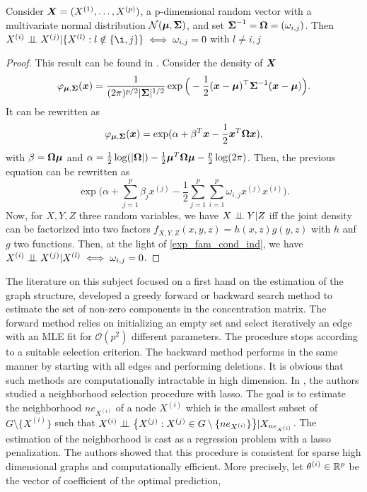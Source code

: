 \begin{lemma}
Consider $\boldsymbol X=(X^{(1)},\dots,X^{(p)})$, a p-dimensional random vector with a multivariate normal distribution $\mathcal N(\boldsymbol\mu, \boldsymbol\Sigma)$, and set $\boldsymbol\Sigma^{-1}=\boldsymbol\Omega=(\omega_{i,j})$. Then $X^{(i)} \ci X^{(j)}|\{X^{(l)}: l\notin\{\i,j\}\} \iff \omega_{i,j}=0$ with $l\neq i,j$ 
\end{lemma}
\begin{proof}
This result can be found in \citep{edwards2000introduction}. Consider the density of $\boldsymbol X$
\begin{equation}
  \varphi_{\boldsymbol\mu,\boldsymbol\Sigma}(\boldsymbol x)=\frac{1}{(2\pi)^{p/2}|\boldsymbol\Sigma|^{1/2}} \exp\Big(-\frac{1}{2}(\boldsymbol x-\boldsymbol\mu)^\top\boldsymbol\Sigma^{-1}(\boldsymbol x-\boldsymbol\mu)\Big).
\end{equation}
It can be rewritten as
\begin{equation}
  \varphi_{\boldsymbol\mu,\boldsymbol\Sigma}(\boldsymbol x) = \exp(\alpha + \beta^T\boldsymbol x-\frac{1}{2}\boldsymbol x^T\boldsymbol\Omega\boldsymbol x),
\end{equation}
with $\beta=\boldsymbol\Omega\boldsymbol\mu$ and $\alpha=\frac{1}{2}\log(|\boldsymbol\Omega|)-\frac{1}{2}\boldsymbol\mu^T\boldsymbol\Omega\boldsymbol\mu-\frac{p}{2}\log(2\pi)$. Then, the previous equation can be rewritten as 
\begin{equation}
\label{exp_fam_cond_ind}
  \exp\big(\alpha + \sum_{j=1}^p\beta_jx^{(j)}-\frac{1}{2}\sum_{j=1}^p\sum_{i=1}^p\omega_{i,j}x^{(j)}x^{(i)}\big).
\end{equation}
Now, for $X,Y,Z$ three random variables, we have $X \perp\!\!\!\perp Y|Z$ iff the joint density can be factorized into two factors $f_{X,Y,Z}(x,y,z)=h(x,z)g(y,z)$ with $h$ anf $g$ two functions. Then, at the light of  \cref{exp_fam_cond_ind}, we have $X^{(i)}\perp\!\!\!\perp X^{(j)}|X^{(l)} \iff \omega_{i,j}=0$.
\end{proof}
The literature on this subject focused on a first hand on the estimation of the graph structure, \citep{dempster1972cov_select} developed a greedy forward or backward search method to estimate the set of non-zero components in the concentration matrix. The forward method relies on initializing an empty set and select iteratively an edge with an MLE fit for $\mathcal{O}(p^2)$ different parameters. The procedure stops according to a suitable selection criterion. The backward method performs in the same manner by starting with all edges and performing deletions. It is obvious that such methods are computationally intractable in high dimension. In \citep{meinshausen2006}, the authors studied a neighborhood selection procedure with lasso. The goal is to estimate the neighborhood $ne_{X^{(i)}}$ of a node $X^{(i)}$ which is the smallest subset of $G\setminus\{X^{(i)}\}$ such that $X^{(i)} \perp\!\!\!\perp \big\{X^{(j)}: X^{(j)}\in G\setminus\{ne_{X^{(i)}}\}\big\} | X_{ne_{X^{(i)}}}$. The estimation of the neighborhood is cast as a regression problem with a lasso penalization. The authors showed that this procedure is consistent for sparse high dimensional graphs and computationally efficient. More precisely, let $\theta^{(i)} \in {\mathbb R} ^p$ be the vector of coefficient of the optimal prediction,
